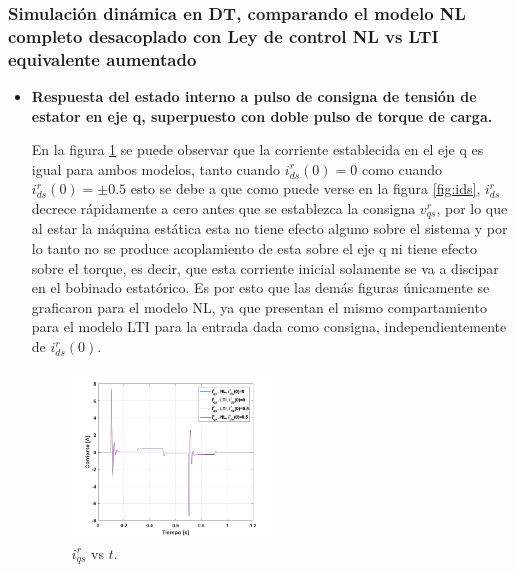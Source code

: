 \documentclass[10pt]{article}
\begin{document}
\subsubsection{Simulación dinámica en DT, comparando el modelo NL completo desacoplado con Ley de control
NL vs LTI equivalente aumentado}
\begin{itemize}

\item \textbf{Respuesta del estado interno a pulso de consigna de tensión de estator en eje q, superpuesto con doble pulso de torque de carga.}
	
	En la figura \ref{fig:iq_LTIvsNL} se puede observar que la corriente establecida en el eje q es igual para ambos modelos, tanto cuando $i^{r}_{ds}(0)=0$ como cuando $i^{r}_{ds}(0)=\pm 0.5$ esto se debe a que como puede verse en la figura \ref{fig:ids}, $i^{r}_{ds}$ decrece rápidamente a cero antes que se establezca la consigna $v^{r}_{qs}$, por lo que al estar la máquina estática esta no tiene efecto alguno sobre el sistema y por lo tanto no se produce acoplamiento de esta sobre el eje q ni tiene efecto sobre el torque, es decir, que esta corriente inicial solamente se va a discipar en el bobinado estatórico. Es por esto que las demás figuras únicamente se graficaron para el modelo NL, ya que presentan el mismo compartamiento para el modelo LTI para la entrada dada como consigna, independientemente de $i^{r}_{ds}(0)$.\\
			\begin{figure}[h!]
	\centering
	\includegraphics[width=0.5\textwidth]{iq_LTIvsNL.png}
	\caption{\label{fig:iq_LTIvsNL} $i^{r}_{qs}$ vs $t$.}
	\end{figure}
		


\end{itemize}
\end{document}
